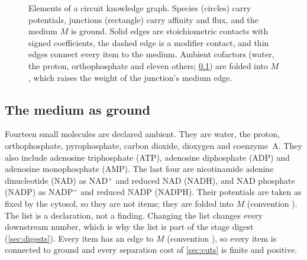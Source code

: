 \begin{figure}[t]
\centering
{}
\caption{Elements of a circuit knowledge graph.
Species (circles) carry potentials, junctions (rectangle) carry affinity and flux, and the medium $M$ is ground.
Solid edges are stoichiometric contacts with signed coefficients, the dashed edge is a modifier contact, and thin edges connect every item to the medium.
Ambient cofactors (water, the proton, orthophosphate and eleven others; \cref{sec:medium-ground}) are folded into $M$, which raises the weight of the junction's medium edge.}
\label{fig:schema}
\end{figure}

\subsection{The medium as ground}
\label{sec:medium-ground}

Fourteen small molecules are declared ambient.
They are water, the proton, orthophosphate, pyrophosphate, carbon dioxide, dioxygen and coenzyme~A.
They also include adenosine triphosphate (ATP), adenosine diphosphate (ADP) and adenosine monophosphate (AMP).
The last four are nicotinamide adenine dinucleotide (NAD) as NAD$^+$ and reduced NAD (NADH), and NAD phosphate (NADP) as NADP$^+$ and reduced NADP (NADPH).
Their potentials are taken as fixed by the cytosol, so they are not items; they are folded into $M$ (convention ).
The list is a declaration, not a finding.
Changing the list changes every downstream number, which is why the list is part of the stage digest (\cref{sec:digests}).
Every item has an edge to $M$ (convention ), so every item is connected to ground and every separation cost of \cref{sec:cuts} is finite and positive.

